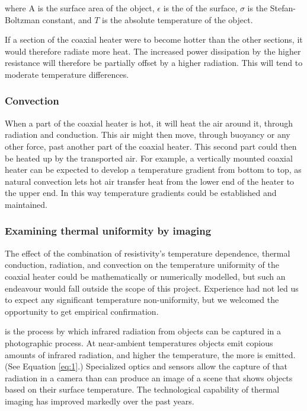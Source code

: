 where A is the surface area of the object, \(\epsilon\) is the
 of the surface, \(\sigma\) is the Stefan-Boltzman constant,
and \(T\) is the absolute temperature of the object. 

If a section of the coaxial heater were to become hotter than the other
sections, it would therefore radiate more heat. The increased power dissipation
by the higher resistance will therefore be partially offset by a higher
radiation. This will tend to moderate temperature differences.

\subsubsection{Convection}

When a part of the coaxial heater is hot, it will heat the air around it,
through radiation and conduction. This air might then move, through buoyancy or
any other force, past another part of the coaxial heater. This second part could
then be heated up by the transported air. For example, a vertically mounted
coaxial heater can be expected to develop a temperature gradient from bottom to
top, as natural convection lets hot air transfer heat from the lower end of the
heater to the upper end. In this way temperature gradients could be established
and maintained.

\subsubsection{Examining thermal uniformity by imaging}

The effect of the combination of resistivity's temperature dependence, thermal
conduction, radiation, and convection on the temperature uniformity of the
coaxial heater could be mathematically or numerically modelled, but such an
endeavour would fall outside the scope of this project. Experience had not led
us to expect any significant temperature non-uniformity, but we welcomed the 
opportunity to get empirical confirmation.

 is the process by which infrared radiation from objects
can be captured in a photographic process. At near-ambient temperatures objects
emit copious amounts of infrared radiation, and higher the temperature, the more
is emitted. (See Equation \ref{eq:1}.) Specialized optics and sensors allow the
capture of that radiation in a camera than can produce an image of a scene
that shows objects based on their surface temperature. The technological
capability of thermal imaging has improved markedly over the past years.

